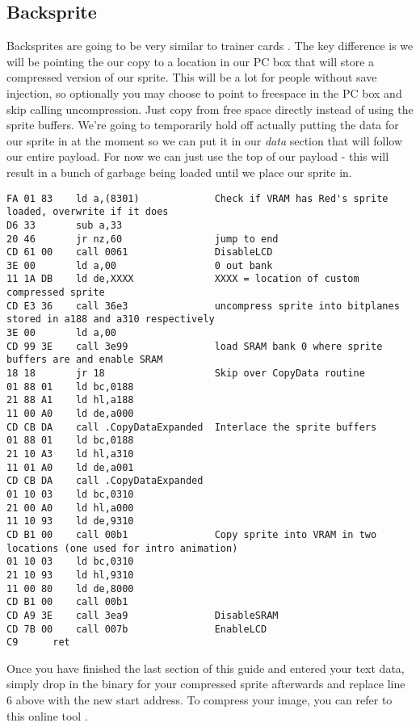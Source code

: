 \documentclass[../main.tex]{subfiles}
\begin{document}
    \subsection{Backsprite}
    Backsprites are going to be very similar to trainer cards .  The key difference is we will be pointing the our copy to a location in our PC box that will store a compressed version of our sprite. This will be a lot for people without save injection, so optionally you may choose to point to freespace in the PC box and skip calling uncompression.  Just copy from free space directly instead of using the sprite buffers.  We're going to temporarily hold off actually putting the data for our sprite in at the moment so we can put it in our \textit{data} section that will follow our entire payload.  For now we can just use the top of our payload - this will result in a bunch of garbage being loaded until we place our sprite in.

    \begin{verbatim}
FA 01 83	ld a,(8301)		        Check if VRAM has Red's sprite loaded, overwrite if it does
D6 33		sub a,33
20 46		jr nz,60		        jump to end
CD 61 00	call 0061		        DisableLCD
3E 00		ld a,00			        0 out bank
11 1A DB	ld de,XXXX		        XXXX = location of custom compressed sprite
CD E3 36	call 36e3		        uncompress sprite into bitplanes stored in a188 and a310 respectively
3E 00		ld a,00
CD 99 3E	call 3e99		        load SRAM bank 0 where sprite buffers are and enable SRAM
18 18		jr 18			        Skip over CopyData routine
01 88 01	ld bc,0188
21 88 A1	ld hl,a188
11 00 A0	ld de,a000
CD CB DA	call .CopyDataExpanded	Interlace the sprite buffers
01 88 01	ld bc,0188
21 10 A3	ld hl,a310
11 01 A0	ld de,a001
CD CB DA	call .CopyDataExpanded
01 10 03	ld bc,0310
21 00 A0	ld hl,a000
11 10 93	ld de,9310
CD B1 00	call 00b1		        Copy sprite into VRAM in two locations (one used for intro animation)
01 10 03	ld bc,0310
21 10 93	ld hl,9310
11 00 80	ld de,8000
CD B1 00	call 00b1
CD A9 3E	call 3ea9		        DisableSRAM
CD 7B 00	call 007b		        EnableLCD
C9		ret
    \end{verbatim}

    Once you have finished the last section of this guide and entered your text data, simply drop in the binary for your compressed sprite afterwards and replace line 6 above with the new start address.  To compress your image, you can refer to this online tool \cite{spriteCompressionTool}.
\end{document}
